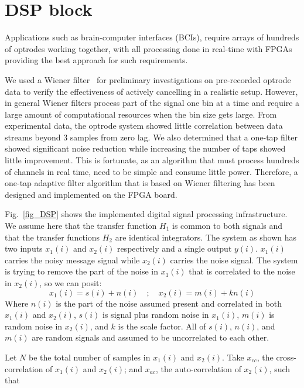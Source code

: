\section{DSP block}



Applications such as brain-computer interfaces (BCIs), require arrays of hundreds of optrodes working together, with all processing done in real-time with FPGAs providing the best approach for such requirements.

We used a Wiener filter~\cite{WienerFilter} for preliminary investigations on pre-recorded optrode data to verify the effectiveness of actively cancelling in a realistic setup. However, in general Wiener filters process part of the signal one bin at a time and require a large amount of computational resources when the bin size gets large.  From experimental data, the optrode system showed little correlation between data streams beyond 3 samples from zero lag. We also determined that a one-tap filter showed significant noise reduction while increasing the number of taps showed little improvement.  This is fortunate, as an algorithm that must process hundreds of channels in real time, need to be simple and consume little power.  Therefore, a one-tap adaptive filter algorithm that is based on Wiener filtering has been designed and implemented on the FPGA board.

Fig.~\ref{fig_DSP} shows the implemented digital signal processing infrastructure.  We assume here that the transfer function $H_1$ is common to both signals and that the transfer functions $H_2$ are identical integrators.  The system as shown has two inputs $x_1(i)$ and $x_2(i)$ respectively and a single output $y(i)$.  $x_1(i)$ carries the noisy message signal while $x_2(i)$ carries the noise signal.  The system is trying to remove the part of the noise in $x_1(i)$ that is correlated to the noise in $x_2(i)$, so we can posit:
$$x_1(i)=s(i)+n(i) \quad;\quad x_2(i)=m(i)+kn(i)$$
Where $n(i)$ is the part of the noise assumed present and correlated in both $x_1(i)$ and $x_2(i)$, $s(i)$ is signal plus random noise in $x_1(i)$, $m(i)$ is random noise in $x_2(i)$, and $k$ is the scale factor.  All of $s(i)$, $n(i)$, and $m(i)$ are random signals and assumed to be uncorrelated to each other.

Let $N$ be the total number of samples in $x_1(i)$ and $x_2(i)$.  Take $x_{cc}$, the cross-correlation of $x_1(i)$ and $x_2(i)$; and $x_{ac}$, the auto-correlation of $x_2(i)$, such that

